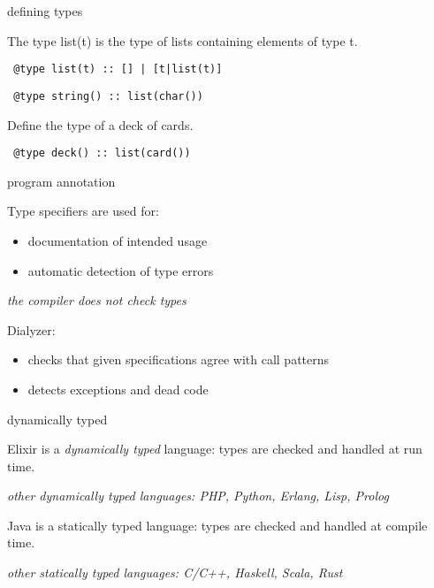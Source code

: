 \begin{frame}[fragile]{defining types}

The type list(t) is the type of lists containing elements of type t.
\pause

\begin{verbatim}
 @type list(t) :: [] | [t|list(t)]
\end{verbatim}

\pause
\begin{verbatim}
 @type string() :: list(char())
\end{verbatim}

Define the type of a deck of cards.
\pause
\begin{verbatim}
 @type deck() :: list(card())
\end{verbatim}

\end{frame}


\begin{frame}{program annotation}

Type specifiers are used for:
\begin{itemize}
\item documentation of intended usage
\pause
\item automatic detection of type errors
\end{itemize}

\pause\vspace{10pt}
{\em the compiler does not check types}

\pause\vspace{10pt}
Dialyzer:

\begin{itemize}
\item checks that given specifications agree with call patterns
\item detects exceptions and dead code 
\end{itemize}

\end{frame}


\begin{frame}{dynamically typed}

Elixir is a {\em dynamically typed} language: types are checked and handled at run time.

{\em other dynamically typed languages: PHP, Python, Erlang, Lisp, Prolog}

\vspace{20pt}

Java is a {statically typed} language: types are checked and handled at compile time.

{\em other statically typed languages: C/C++, Haskell, Scala, Rust}

\end{frame}

